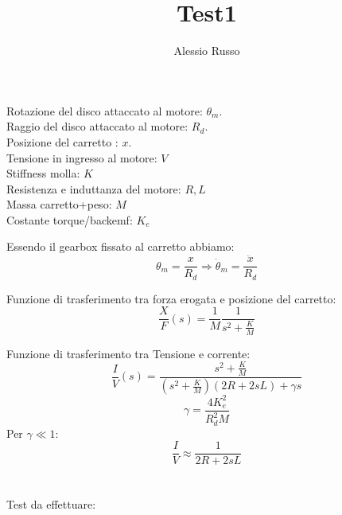 \documentclass[10pt,a4paper]{book}
\author{Alessio Russo}
\title{Test1}
\begin{document}
Rotazione del disco attaccato al motore: $\theta_m$. \\
Raggio del disco attaccato al motore: $R_d$. \\
Posizione del carretto : $x$. \\
Tensione in ingresso al motore: $V$ \\
Stiffness molla: $K$ \\
Resistenza e induttanza del motore: $R,L$ \\
Massa carretto+peso: $M$ \\
Costante torque/backemf: $K_e$

Essendo il gearbox fissato al carretto abbiamo:
$$\theta_m = \frac{x}{R_d} \Rightarrow \dot{\theta}_m = \frac{\ddot{x}}{R_d}$$

Funzione di trasferimento tra forza erogata e posizione del carretto:
$$\frac{X}{F}(s) = \frac{1}{M} \frac{1}{s^2+\frac{K}{M}}$$

Funzione di trasferimento tra Tensione e corrente:
$$\frac{I}{V}(s) = \frac{s^2+\frac{K}{M}}{(s^2+\frac{K}{M})(2R+2sL)+\gamma s}$$
$$\gamma = \frac{4K_e^2}{R_d^2M}$$
Per $\gamma \ll 1$:
$$\frac{I}{V} \approx \frac{1}{2R+2sL}$$
\\ \\
Test da effettuare:
\begin{enumerate}
\item {Ricavare K}.
\item {
\end{enumerate}
\end{document}
